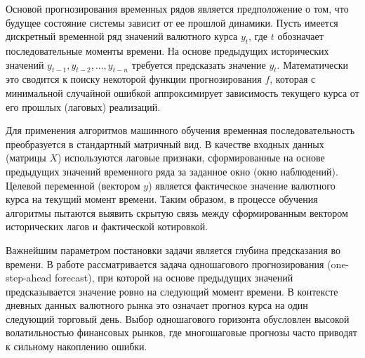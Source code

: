 Основой прогнозирования временных рядов является предположение о том, что будущее состояние системы зависит от ее прошлой динамики. Пусть имеется дискретный временной ряд значений валютного курса $y_t$, где $t$ обозначает последовательные моменты времени. На основе предыдущих исторических значений $y_{t−1},y_{t−2},...,y_{t−n}$ требуется предсказать значение $y_t$. Математически это сводится к поиску некоторой функции прогнозирования $f$, которая с минимальной случайной ошибкой аппроксимирует зависимость текущего курса от его прошлых (лаговых) реализаций.

Для применения алгоритмов машинного обучения временная последовательность преобразуется в стандартный матричный вид. В качестве входных данных (матрицы $X$) используются лаговые признаки, сформированные на основе предыдущих значений временного ряда за заданное окно (окно наблюдений). Целевой переменной (вектором $y$) является фактическое значение валютного курса на текущий момент времени. Таким образом, в процессе обучения алгоритмы пытаются выявить скрытую связь между сформированным вектором исторических лагов и фактической котировкой.

Важнейшим параметром постановки задачи является глубина предсказания во времени. В работе рассматривается задача одношагового прогнозирования (one-step-ahead forecast), при которой на основе предыдущих значений предсказывается значение ровно на следующий момент времени. В контексте дневных данных валютного рынка это означает прогноз курса на один следующий торговый день. Выбор одношагового горизонта обусловлен высокой волатильностью финансовых рынков, где многошаговые прогнозы часто приводят к сильному накоплению ошибки.

